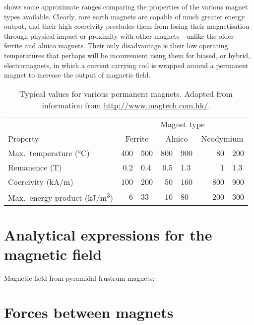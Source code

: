  shows some approximate ranges comparing the
properties of the various magnet types available. Clearly, rare earth
magnets are capable of much greater energy output, and their high
coercivity precludes them from losing their magnetisation through
physical impact or proximity with other magnets---unlike the older
ferrite and alnico magnets. Their only disadvantage is their low
operating temperatures that perhaps will be inconvenient using them
for biased, or hybrid, electromagnets, in which a current carrying
coil is wrapped around a permanent magnet to increase the output of
magnetic field.

\begin{table}
  \centering
  \begin{tabular}{@{} l r@{\,--\,}l r@{\,--\,}l r@{\,--\,}l @{}}
    \toprule
    & \multicolumn{6}{c}{Magnet type}\\
    \cmidrule{2-6}
    Property            & \multicolumn{2}{c}{Ferrite}
                        & \multicolumn{2}{c}{Alnico}
                        & \multicolumn{2}{c}{Neodymium}  \\
    \midrule
    Max.\ temperature (°C)    & \num{400} & \num{500} & \num{800} & \num{900} &    \num{ 80} & \num{200}  \\
    Remanence (T)             & \num{0.2} & \num{0.4} & \num{0.5} & \num{1.3} &    \num{  1} & \num{1.3}  \\
    Coercivity (\si{kA/m})    & \num{100} & \num{200} & \num{50 } & \num{160} & ~~~\num{800} & \num{900}  \\
    Max.\ energy product
               (\si{kJ/m^3})  & \num{6}   & \num{33}  & \num{10}  & \num{80}  &    \num{200} & \num{300}  \\
    \bottomrule
  \end{tabular}
  \caption[Typical values for various permanent magnets.]
  {Typical values for various permanent magnets.
   Adapted from information from \url{http://www.magtech.com.hk/}.}
\end{table}


\section{Analytical expressions for the magnetic field}

Magnetic field from pyramidal frustrum magnets: \cite{compter2010-ietm}


\section{Forces between magnets}


